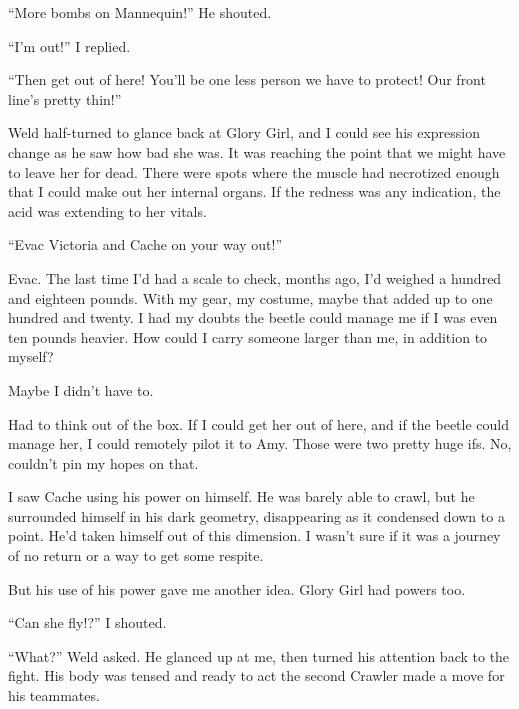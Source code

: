 ``More bombs on Mannequin!''  He shouted.



``I'm out!''  I replied.



``Then get out of here!  You'll be one less person we have to protect!  Our front line's pretty thin!''



Weld half-turned to glance back at Glory Girl, and I could see his expression change as he saw how bad she was.  It was reaching the point that we might have to leave her for dead. There were spots where the muscle had necrotized enough that I could make out her internal organs.  If the redness was any indication, the acid was extending to her vitals.



``Evac Victoria and Cache on your way out!''



Evac.  The last time I'd had a scale to check, months ago, I'd weighed a hundred and eighteen pounds.  With my gear, my costume, maybe that added up to one hundred and twenty.  I had my doubts the beetle could manage me if I was even ten pounds heavier.  How could I carry someone larger than me, in addition to myself?



Maybe I didn't have to.



Had to think out of the box.  If I could get her out of here, and if the beetle could manage her, I could remotely pilot it to Amy.  Those were two pretty huge ifs.  No, couldn't pin my hopes on that.



I saw Cache using his power on himself.  He was barely able to crawl, but he surrounded himself in his dark geometry, disappearing as it condensed down to a point.  He'd taken himself out of this dimension.  I wasn't sure if it was a journey of no return or a way to get some respite.



But his use of his power gave me another idea.  Glory Girl had powers too.



``Can she fly!?''  I shouted.



``What?''  Weld asked.  He glanced up at me, then turned his attention back to the fight.  His body was tensed and ready to act the second Crawler made a move for his teammates.



